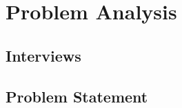 \chapter{Problem Analysis}
\label{cha:problem_analysis}
\section{Interviews}






\section{Problem Statement}
\label{ProblemStatement}


